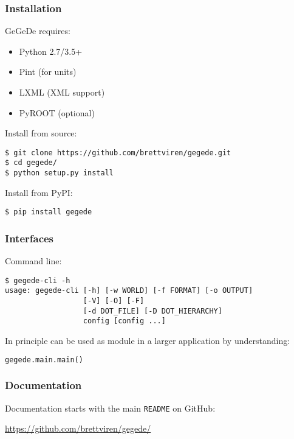 \documentclass[10pt,xcolor=dvipsnames]{beamer}
\begin{document}
\begin{frame}[fragile]
  \frametitle{Installation}
  GeGeDe requires:
  \begin{itemize}
  \item Python 2.7/3.5+
  \item Pint (for units)
  \item LXML (XML support)
  \item PyROOT (optional)
  \end{itemize}

  \vfill

  Install from source:
\begin{verbatim}
$ git clone https://github.com/brettviren/gegede.git
$ cd gegede/
$ python setup.py install
\end{verbatim}

  \vfill

  Install from PyPI:
\begin{verbatim}
$ pip install gegede
\end{verbatim}
\end{frame}

\begin{frame}[fragile]
  \frametitle{Interfaces}
  Command line:
\begin{verbatim}
$ gegede-cli -h
usage: gegede-cli [-h] [-w WORLD] [-f FORMAT] [-o OUTPUT] 
                  [-V] [-O] [-F]
                  [-d DOT_FILE] [-D DOT_HIERARCHY]
                  config [config ...]
\end{verbatim}

  \vfill

  In principle can be used as module in a larger application by understanding: 
  \begin{lstlisting}[language=Python]
    gegede.main.main()
  \end{lstlisting}
  
\end{frame}

\begin{frame}
  \frametitle{Documentation}

  \begin{center}
    Documentation starts with the main \texttt{README} on GitHub:

    \vspace{1cm}

    \url{https://github.com/brettviren/gegede/}    
  \end{center}

\end{frame}
\end{document}
